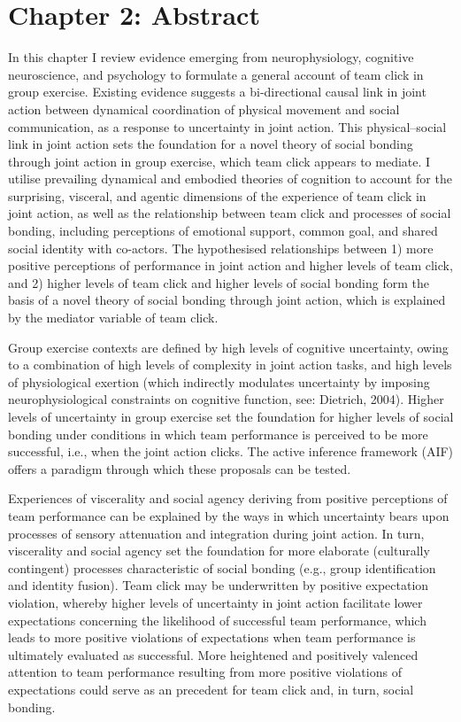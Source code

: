 \chapter*{Chapter 2: Abstract}

In this chapter I review evidence emerging from neurophysiology, cognitive neuroscience, and psychology to formulate a general account of team click in group exercise. Existing evidence suggests a bi-directional causal link in joint action between dynamical coordination of physical movement and social communication, as a response to uncertainty in joint action.  This physical--social link in joint action sets the foundation for a novel theory of social bonding through joint action in group exercise, which team click appears to mediate.  I utilise prevailing dynamical and embodied theories of cognition to account for the surprising, visceral, and agentic dimensions of the experience of team click in joint action, as well as the relationship between team click and processes of social bonding, including perceptions of emotional support, common goal, and shared social identity with co-actors.  The hypothesised relationships between 1) more positive perceptions of performance in joint action and higher levels of team click, and 2) higher levels of team click and higher levels of social bonding form the basis of a novel theory of social bonding through joint action, which is explained by the mediator variable of team click.


Group exercise contexts are defined by high levels of cognitive uncertainty, owing to a combination of high levels of complexity in joint action tasks, and high levels of physiological exertion (which indirectly modulates uncertainty by imposing neurophysiological constraints on cognitive function, see: Dietrich, 2004).  Higher levels of uncertainty in group exercise set the foundation for higher levels of social bonding under conditions in which team performance is perceived to be more successful, i.e., when the joint action clicks.   The active inference framework (AIF) offers a paradigm through which these proposals can be tested.

Experiences of viscerality and social agency deriving from positive perceptions of team performance can be explained by the ways in which uncertainty bears upon processes of sensory attenuation and integration during joint action.  In turn, viscerality and social agency set the foundation for more elaborate (culturally contingent) processes characteristic of social bonding (e.g., group identification and identity fusion).  Team click may be underwritten by positive expectation violation, whereby higher levels of uncertainty in joint action facilitate lower expectations concerning the likelihood of successful team performance, which leads to more positive violations of expectations when team performance is ultimately evaluated as successful.  More heightened and positively valenced attention to team performance resulting from more positive violations of expectations could serve as an precedent for team click and, in turn, social bonding.



